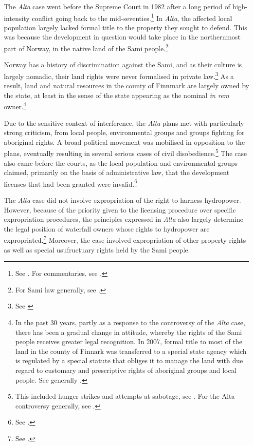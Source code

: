 The {\it Alta} case went before the Supreme Court in 1982 after a long period of high-intensity conflict going back to the mid-seventies.\footnote{See \cite{alta82}. For commentaries, see \cite{eckhoff82,boe83,hagvar88}.} In {\it Alta}, the affected local population largely lacked formal title to the property they sought to defend. This was because the development in question would take place in the northernmost part of Norway, in the native land of the Sami people.\footnote{For Sami law generally, see \cite{skogvang02}.}

Norway has a history of discrimination against the Sami, and as their culture is largely nomadic, their land rights were never formalised in private law.\footnote{See \cite[149-156]{ravna12s}} As a result, land and natural resources in the county of Finnmark are largely owned by the state, at least in the sense of the state appearing as the nominal {\it in rem} owner.\footnote{In the past 30 years, partly as a response to the controversy of the {\it Alta} case, there has been a gradual change in attitude, whereby the rights of the Sami people receives greater legal recognition. In 2007, formal title to most of the land in the county of Finnark was transferred to a special state agency which is regulated by a special statute that obliges it to manage the land with due regard to customary and prescriptive rights of aboriginal groups and local people. See generally \cite{bull07}.}

Due to the sensitive context of interference, the {\it Alta} plans met with particularly strong criticism, from local people, environmental groups and groups fighting for aboriginal rights. A broad political movement was mobilised in opposition to the plans, eventually resulting in several serious cases of civil disobedience.\footnote{This included hunger strikes and attempts at sabotage, see \cite[80-83]{nilsen08}. For the Alta controversy generally, see \cite{altawiki,hjorthol06}.} The case also came before the courts, as the local population and environmental groups claimed, primarily on the basis of administrative law, that the development licenses that had been granted were invalid.\footnote{See \cite{eckhoff82}.}

The {\it Alta} case did not involve expropriation of the right to harness hydropower. However, because of the priority given to the licensing procedure over specific expropriation procedures, the principles expressed in {\it Alta} also largely determine the legal position of waterfall owners whose rights to hydropower are expropriated.\footnote{See \cite{sauda09,jorpeland11}.} Moreover, the case involved expropriation of other property rights as well as special usufructuary rights held by the Sami people.

